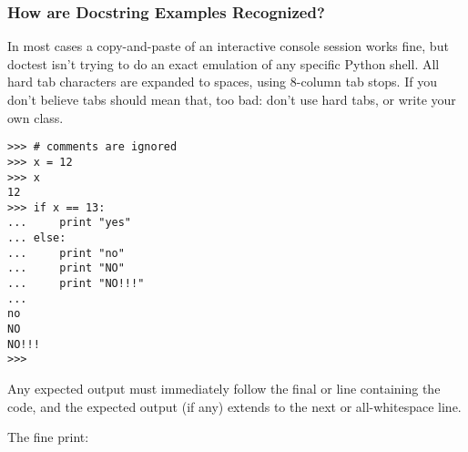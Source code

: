 \subsubsection{How are Docstring Examples
               Recognized?\label{doctest-finding-examples}}

In most cases a copy-and-paste of an interactive console session works
fine, but doctest isn't trying to do an exact emulation of any specific
Python shell.  All hard tab characters are expanded to spaces, using
8-column tab stops.  If you don't believe tabs should mean that, too
bad:  don't use hard tabs, or write your own 
class.


\begin{verbatim}
>>> # comments are ignored
>>> x = 12
>>> x
12
>>> if x == 13:
...     print "yes"
... else:
...     print "no"
...     print "NO"
...     print "NO!!!"
...
no
NO
NO!!!
>>>
\end{verbatim}

Any expected output must immediately follow the final
 or  line containing the code, and
the expected output (if any) extends to the next 
or all-whitespace line.

The fine print:

